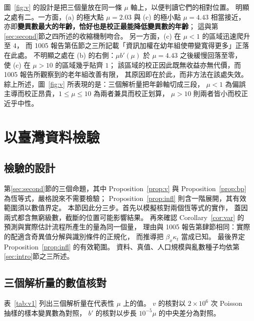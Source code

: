 \documentclass[UTF8, fontset=macnew, a4paper, 12pt]{ctexart}
\begin{document}
圖~\ref{fig:v} 的設計是把三個量放在同一條 $\mu$ 軸上，以便判讀它們的相對位置。
明顯之處有二。一方面，(a) 的極大點 $\mu=2.03$ 與 (c) 的極小點 $\mu=4.43$
相當接近，亦即\textbf{變異數最大的年齡，恰好也是校正最能降低變異數的年齡}；
這與第\ref{sec:second}節之四所述的收縮機制吻合。
另一方面，(c) 在 $\mu<1$ 的區域迅速爬升至 $4$，
而 1005 報告第伍節之三所記載「資訊加權在幼年組使帶變寬得更多」正落在此處。
不明顯之處在 (b) 的右側：$\mu b'(\mu)$ 於 $\mu=4.43$ 之後緩慢回落至零，
使 (c) 在 $\mu>10$ 的區域幾乎貼齊 $1$；
該區域的校正因此既無收益亦無代價，而 1005 報告所觀察到的老年組改善有限，
其原因即在於此，而非方法在該處失效。
綜上所述，圖~\ref{fig:v} 所表現的是：三個解析量把年齡軸切成三段，
$\mu<1$ 為偏誤主導而校正昂貴，$1\le\mu\le10$ 為兩者兼具而校正划算，
$\mu>10$ 則兩者皆小而校正近乎中性。

\section{以臺灣資料檢驗}\label{sec:check}

\subsection{檢驗的設計}

第\ref{sec:second}節的三個命題，其中 Proposition~\ref{prop:v} 與
Proposition~\ref{prop:bp} 為恆等式，嚴格說來不需要檢驗；
Proposition~\ref{prop:infl} 則含一階展開，其有效範圍須以數值界定。
本節因此分三步。首先以模擬核對兩個恆等式的實作，
蓋因兩式都含無窮級數，截斷的位置可能影響結果。
再來確認 Corollary~\ref{cor:var} 的預測與實際估計流程所產生的量為同一個量，
理由與 1005 報告第肆節相同：實際的配適含奇異值分解與識別條件的正規化，
而推導把 $\beta_x\kappa_t$ 當成已知。
最後界定 Proposition~\ref{prop:infl} 的有效範圍。
資料、真值、人口規模與亂數種子均依第\ref{sec:intro}節之三所述。

\subsection{三個解析量的數值核對}

表~\ref{tab:v1} 列出三個解析量在代表性 $\mu$ 上的值。
$v$ 的核對以 $2\times10^{6}$ 次 Poisson 抽樣的樣本變異數為對照，
$b'$ 的核對以步長 $10^{-5}\mu$ 的中央差分為對照。
\end{document}
